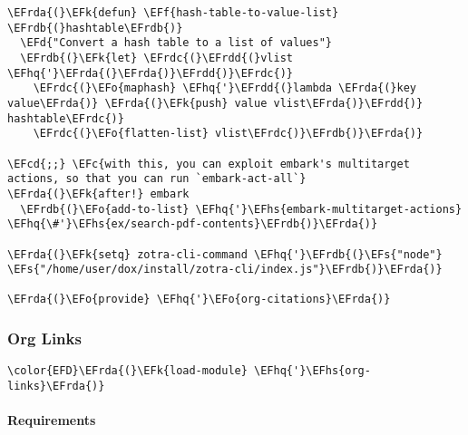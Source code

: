 \documentclass[a4wide,10pt]{article}
\newcommand{\EFc}[1]{\textcolor{EFc}{#1}} %
\newcommand{\EFcd}[1]{\textcolor{EFcd}{#1}} %
\newcommand{\EFs}[1]{\textcolor{EFs}{#1}} %
\newcommand{\EFd}[1]{\textcolor{EFd}{#1}} %
\newcommand{\EFk}[1]{\textcolor{EFk}{#1}} %
\newcommand{\EFf}[1]{\textcolor{EFf}{#1}} %
\newcommand{\EFo}[1]{\textcolor{EFo}{#1}} %
\newcommand{\EFhq}[1]{\textcolor{EFhq}{#1}} %
\newcommand{\EFhs}[1]{\textcolor{EFhs}{#1}} %
\newcommand{\EFrda}[1]{\textcolor{EFrda}{#1}} %
\newcommand{\EFrdb}[1]{\textcolor{EFrdb}{#1}} %
\newcommand{\EFrdc}[1]{\textcolor{EFrdc}{#1}} %
\newcommand{\EFrdd}[1]{\textcolor{EFrdd}{#1}} %
\begin{document}
\begin{Code}
\begin{Verbatim}
\EFrda{(}\EFk{defun} \EFf{hash-table-to-value-list} \EFrdb{(}hashtable\EFrdb{)}
  \EFd{"Convert a hash table to a list of values"}
  \EFrdb{(}\EFk{let} \EFrdc{(}\EFrdd{(}vlist \EFhq{'}\EFrda{(}\EFrda{)}\EFrdd{)}\EFrdc{)}
    \EFrdc{(}\EFo{maphash} \EFhq{'}\EFrdd{(}lambda \EFrda{(}key value\EFrda{)} \EFrda{(}\EFk{push} value vlist\EFrda{)}\EFrdd{)} hashtable\EFrdc{)}
    \EFrdc{(}\EFo{flatten-list} vlist\EFrdc{)}\EFrdb{)}\EFrda{)}

\EFcd{;;} \EFc{with this, you can exploit embark's multitarget actions, so that you can run `embark-act-all`}
\EFrda{(}\EFk{after!} embark
  \EFrdb{(}\EFo{add-to-list} \EFhq{'}\EFhs{embark-multitarget-actions} \EFhq{\#'}\EFhs{ex/search-pdf-contents}\EFrdb{)}\EFrda{)}

\EFrda{(}\EFk{setq} zotra-cli-command \EFhq{'}\EFrdb{(}\EFs{"node"} \EFs{"/home/user/dox/install/zotra-cli/index.js"}\EFrdb{)}\EFrda{)}

\EFrda{(}\EFo{provide} \EFhq{'}\EFo{org-citations}\EFrda{)}
\end{Verbatim}
\end{Code}
\subsubsection{Org Links}
\label{sec:orga174782}
\begin{Code}
\begin{Verbatim}
\color{EFD}\EFrda{(}\EFk{load-module} \EFhq{'}\EFhs{org-links}\EFrda{)}
\end{Verbatim}
\end{Code}
\paragraph{Requirements}
\label{sec:org2ae4347}
\end{document}
